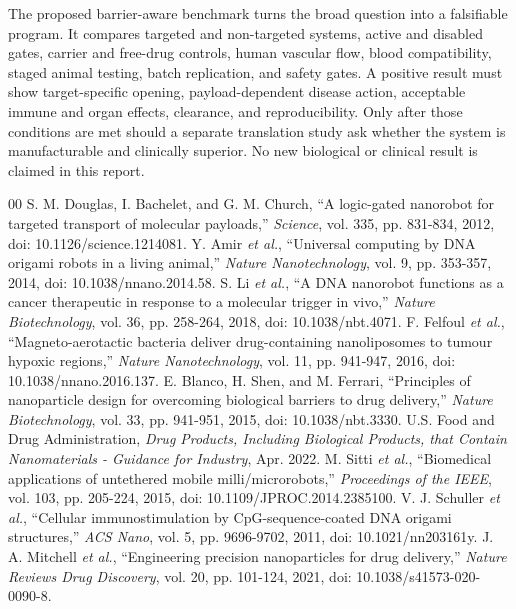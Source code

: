 \documentclass[conference]{IEEEtran}
\begin{document}
The proposed barrier-aware benchmark turns the broad question into a falsifiable program. It compares targeted and non-targeted systems, active and disabled gates, carrier and free-drug controls, human vascular flow, blood compatibility, staged animal testing, batch replication, and safety gates. A positive result must show target-specific opening, payload-dependent disease action, acceptable immune and organ effects, clearance, and reproducibility. Only after those conditions are met should a separate translation study ask whether the system is manufacturable and clinically superior. No new biological or clinical result is claimed in this report.

\begin{thebibliography}{00}
 S. M. Douglas, I. Bachelet, and G. M. Church, ``A logic-gated nanorobot for targeted transport of molecular payloads,'' \emph{Science}, vol. 335, pp. 831-834, 2012, doi: 10.1126/science.1214081.
 Y. Amir \emph{et al.}, ``Universal computing by DNA origami robots in a living animal,'' \emph{Nature Nanotechnology}, vol. 9, pp. 353-357, 2014, doi: 10.1038/nnano.2014.58.
 S. Li \emph{et al.}, ``A DNA nanorobot functions as a cancer therapeutic in response to a molecular trigger in vivo,'' \emph{Nature Biotechnology}, vol. 36, pp. 258-264, 2018, doi: 10.1038/nbt.4071.
 F. Felfoul \emph{et al.}, ``Magneto-aerotactic bacteria deliver drug-containing nanoliposomes to tumour hypoxic regions,'' \emph{Nature Nanotechnology}, vol. 11, pp. 941-947, 2016, doi: 10.1038/nnano.2016.137.
 E. Blanco, H. Shen, and M. Ferrari, ``Principles of nanoparticle design for overcoming biological barriers to drug delivery,'' \emph{Nature Biotechnology}, vol. 33, pp. 941-951, 2015, doi: 10.1038/nbt.3330.
 U.S. Food and Drug Administration, \emph{Drug Products, Including Biological Products, that Contain Nanomaterials - Guidance for Industry}, Apr. 2022.
 M. Sitti \emph{et al.}, ``Biomedical applications of untethered mobile milli/microrobots,'' \emph{Proceedings of the IEEE}, vol. 103, pp. 205-224, 2015, doi: 10.1109/JPROC.2014.2385100.
 V. J. Schuller \emph{et al.}, ``Cellular immunostimulation by CpG-sequence-coated DNA origami structures,'' \emph{ACS Nano}, vol. 5, pp. 9696-9702, 2011, doi: 10.1021/nn203161y.
 J. A. Mitchell \emph{et al.}, ``Engineering precision nanoparticles for drug delivery,'' \emph{Nature Reviews Drug Discovery}, vol. 20, pp. 101-124, 2021, doi: 10.1038/s41573-020-0090-8.
\end{thebibliography}
\end{document}
